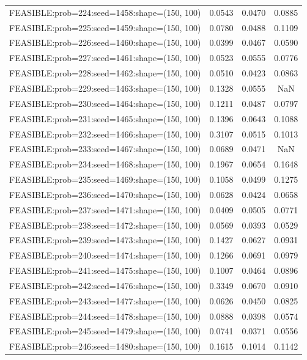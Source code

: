 \begin{longtable}{lccc}
FEASIBLE:prob=224:seed=1458:shape=(150, 100) & 0.0543 & 0.0470 & 0.0885 \\
FEASIBLE:prob=225:seed=1459:shape=(150, 100) & 0.0780 & 0.0488 & 0.1109 \\
FEASIBLE:prob=226:seed=1460:shape=(150, 100) & 0.0399 & 0.0467 & 0.0590 \\
FEASIBLE:prob=227:seed=1461:shape=(150, 100) & 0.0523 & 0.0555 & 0.0776 \\
FEASIBLE:prob=228:seed=1462:shape=(150, 100) & 0.0510 & 0.0423 & 0.0863 \\
FEASIBLE:prob=229:seed=1463:shape=(150, 100) & 0.1328 & 0.0555 &    NaN \\
FEASIBLE:prob=230:seed=1464:shape=(150, 100) & 0.1211 & 0.0487 & 0.0797 \\
FEASIBLE:prob=231:seed=1465:shape=(150, 100) & 0.1396 & 0.0643 & 0.1088 \\
FEASIBLE:prob=232:seed=1466:shape=(150, 100) & 0.3107 & 0.0515 & 0.1013 \\
FEASIBLE:prob=233:seed=1467:shape=(150, 100) & 0.0689 & 0.0471 &    NaN \\
FEASIBLE:prob=234:seed=1468:shape=(150, 100) & 0.1967 & 0.0654 & 0.1648 \\
FEASIBLE:prob=235:seed=1469:shape=(150, 100) & 0.1058 & 0.0499 & 0.1275 \\
FEASIBLE:prob=236:seed=1470:shape=(150, 100) & 0.0628 & 0.0424 & 0.0658 \\
FEASIBLE:prob=237:seed=1471:shape=(150, 100) & 0.0409 & 0.0505 & 0.0771 \\
FEASIBLE:prob=238:seed=1472:shape=(150, 100) & 0.0569 & 0.0393 & 0.0529 \\
FEASIBLE:prob=239:seed=1473:shape=(150, 100) & 0.1427 & 0.0627 & 0.0931 \\
FEASIBLE:prob=240:seed=1474:shape=(150, 100) & 0.1266 & 0.0691 & 0.0979 \\
FEASIBLE:prob=241:seed=1475:shape=(150, 100) & 0.1007 & 0.0464 & 0.0896 \\
FEASIBLE:prob=242:seed=1476:shape=(150, 100) & 0.3349 & 0.0670 & 0.0910 \\
FEASIBLE:prob=243:seed=1477:shape=(150, 100) & 0.0626 & 0.0450 & 0.0825 \\
FEASIBLE:prob=244:seed=1478:shape=(150, 100) & 0.0888 & 0.0398 & 0.0574 \\
FEASIBLE:prob=245:seed=1479:shape=(150, 100) & 0.0741 & 0.0371 & 0.0556 \\
FEASIBLE:prob=246:seed=1480:shape=(150, 100) & 0.1615 & 0.1014 & 0.1142 \\

\end{longtable}
